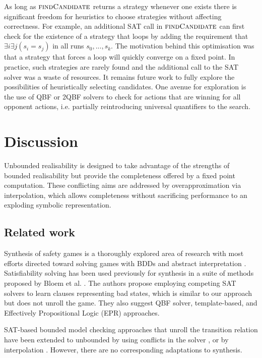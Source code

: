 As long as $\textsc{findCandidate}$ returns a strategy whenever one exists there is significant freedom for heuristics to choose strategies without affecting correctness. For example, an additional SAT call in $\textsc{findCandidate}$ can first check for the existence of a strategy that loops by adding the requirement that $\exists i \exists j (s_i = s_j)$ in all runs $s_0, ..., s_k$. The motivation behind this optimisation was that a strategy that forces a loop will quickly converge on a fixed point. In practice, such strategies are rarely found and the additional call to the SAT solver was a waste of resources. It remains future work to fully explore the possibilities of heuristically selecting candidates. One avenue for exploration is the use of QBF or 2QBF solvers to check for actions that are winning for all opponent actions, i.e. partially reintroducing universal quantifiers to the search.

\section{Discussion}

Unbounded realisability is designed to take advantage of the strengths of bounded realisability but provide the completeness offered by a fixed point computation. These conflicting aims are addressed by overapproximation via interpolation, which allows completeness without sacrificing performance to an exploding symbolic representation.

\subsection{Related work}

Synthesis of safety games is a thoroughly explored area of research with most
efforts directed toward solving games with BDDs \cite{Burch90} and abstract
interpretation \cite{Walker14,Brenguier14}. Satisfiability solving has been used
previously for synthesis in a suite of methods proposed by Bloem et al.
\cite{Bloem14}. The authors propose employing competing SAT solvers to learn
clauses representing bad states, which is similar to our approach but does not
unroll the game.  They also suggest QBF solver, template-based, and Effectively
Propositional Logic (EPR) approaches.

SAT-based bounded model checking approaches that unroll the transition relation
have been extended to unbounded by using conflicts in the solver
\cite{McMillan02}, or by interpolation \cite{McMillan03}. However, there
are no corresponding adaptations to synthesis.

